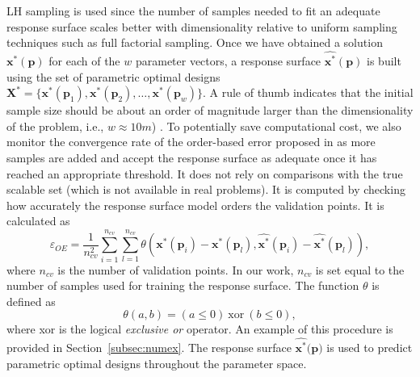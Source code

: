 \ac{LH} sampling is used since the number of samples needed to fit an adequate response surface scales better with dimensionality relative to uniform sampling techniques such as full factorial sampling. Once we have obtained a solution $\mathbf{x}^*({\mathbf{p}})$ for each of the $w$ parameter vectors, a response surface $\hat{\mathbf{x}^*}(\mathbf{p})$ is built using the set of parametric optimal designs $\mathbf{X}^*=  \{ \mathbf{x}^*(\mathbf{p}_1),\mathbf{x}^*(\mathbf{p}_2),\ldots,\mathbf{x}^*(\mathbf{p}_w) \}$. A rule of thumb indicates that the initial sample size should be about an order of magnitude larger than the dimensionality of the problem, i.e., $w \approx 10m$) \cite{Loeppky2008}. To potentially save computational cost, we also monitor the convergence rate of the order-based error proposed in \cite{Audet2018} as more samples are added and accept the response surface as adequate once it has reached an appropriate threshold. It does not rely on comparisons with the true scalable set (which is not available in real problems). It is computed by checking how accurately the response surface model orders the validation points. It is calculated as 
%
\begin{equation}
    \label{eq:oeobjective}
	\varepsilon_{OE} = \frac{1}{n_{cv}^2} \sum_{i=1}^{n_{cv}} \sum_{l=1}^{n_{cv}} \theta\left(\mathbf{x}^*(\mathbf{p}_i) - \mathbf{x}^*(\mathbf{p}_l),\hat{\mathbf{x}^*}(\mathbf{p}_i) - \hat{\mathbf{x}^*}(\mathbf{p}_l)\right),
\end{equation}
%
where $n_{cv}$ is the number of validation points. {\color{red} In our work, $n_{cv}$ is set equal to the number of samples used for training the response surface.} The function $\theta$ is defined as
%
\begin{equation}
    \label{eq:theta}
    \theta\left(a,b\right) = \left(a \le 0\right)~\textrm{xor}~\left(b \le 0\right),
\end{equation}
%
where xor is the logical \textit{exclusive or} operator. An example of this procedure is provided in Section~\ref{subsec:numex}. The response surface $\hat{\mathbf{x}^*}(\mathbf{p)}$ is used to predict parametric optimal designs throughout the parameter space.

